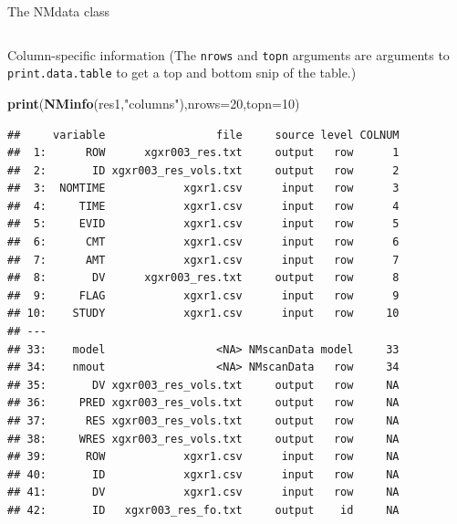 \documentclass[
  8pt,
  ignorenonframetext,
  aspectratio=169]{beamer}
\newenvironment{Shaded}{\begin{snugshade}}{\end{snugshade}}
\newcommand{\DataTypeTok}[1]{\textcolor[rgb]{0.13,0.29,0.53}{#1}}
\newcommand{\DecValTok}[1]{\textcolor[rgb]{0.00,0.00,0.81}{#1}}
\newcommand{\KeywordTok}[1]{\textcolor[rgb]{0.13,0.29,0.53}{\textbf{#1}}}
\newcommand{\NormalTok}[1]{#1}
\newcommand{\StringTok}[1]{\textcolor[rgb]{0.31,0.60,0.02}{#1}}
\begin{document}
\begin{frame}[fragile]{The NMdata class}
\begin{columns}[T]
\begin{column}{0.48\textwidth}
\begin{block}{Column-specific information}
\protect\hypertarget{column-specific-information}{}
(The \texttt{nrows} and \texttt{topn} arguments are arguments to
\texttt{print.data.table} to get a top and bottom snip of the table.)
\scriptsize

\begin{Shaded}
\begin{Highlighting}[]
\KeywordTok{print}\NormalTok{(}\KeywordTok{NMinfo}\NormalTok{(res1,}\StringTok{"columns"}\NormalTok{),}\DataTypeTok{nrows=}\DecValTok{20}\NormalTok{,}\DataTypeTok{topn=}\DecValTok{10}\NormalTok{)}
\end{Highlighting}
\end{Shaded}

\begin{verbatim}
##     variable                 file     source level COLNUM
##  1:      ROW      xgxr003_res.txt     output   row      1
##  2:       ID xgxr003_res_vols.txt     output   row      2
##  3:  NOMTIME            xgxr1.csv      input   row      3
##  4:     TIME            xgxr1.csv      input   row      4
##  5:     EVID            xgxr1.csv      input   row      5
##  6:      CMT            xgxr1.csv      input   row      6
##  7:      AMT            xgxr1.csv      input   row      7
##  8:       DV      xgxr003_res.txt     output   row      8
##  9:     FLAG            xgxr1.csv      input   row      9
## 10:    STUDY            xgxr1.csv      input   row     10
## ---                                                      
## 33:    model                 <NA> NMscanData model     33
## 34:    nmout                 <NA> NMscanData   row     34
## 35:       DV xgxr003_res_vols.txt     output   row     NA
## 36:     PRED xgxr003_res_vols.txt     output   row     NA
## 37:      RES xgxr003_res_vols.txt     output   row     NA
## 38:     WRES xgxr003_res_vols.txt     output   row     NA
## 39:      ROW            xgxr1.csv      input   row     NA
## 40:       ID            xgxr1.csv      input   row     NA
## 41:       DV            xgxr1.csv      input   row     NA
## 42:       ID   xgxr003_res_fo.txt     output    id     NA
\end{verbatim}
\end{block}
\end{column}
\end{columns}
\end{frame}
\end{document}
